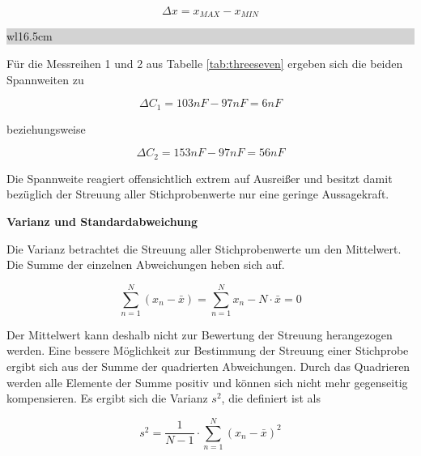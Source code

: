 \begin{equation}\label{eq:threetwentynine}
\Delta x=x_{MAX} -x_{MIN}
\end{equation}

\noindent
\colorbox{lightgray}{%
%
\renewcommand\arraystretch{0.6}%
\begin{tabular}{ wl{16.5cm} }
{\selectfont
{}}
\end{tabular}%
}\bigskip

\noindent F\"{u}r die Messreihen 1 und 2 aus Tabelle \ref{tab:threeseven} ergeben sich die beiden Spannweiten zu 

\begin{equation}\label{eq:threethirty}
\Delta C_{1} = 103 nF-97 nF=6 nF
\end{equation}

\noindent beziehungsweise 

\begin{equation}\label{eq:threethirtyone}
\Delta C_{2} = 153 nF - 97 nF = 56 nF
\end{equation}

\noindent Die Spannweite reagiert offensichtlich extrem auf Ausrei{\ss}er und besitzt damit bez\"{u}glich der Streuung aller Stichprobenwerte nur eine geringe Aussagekraft.\bigskip

{\selectfont
\noindent\textbf{Varianz und Standardabweichung}}

\noindent Die Varianz betrachtet die Streuung aller Stichprobenwerte um den Mittelwert. Die Summe der einzelnen Abweichungen heben sich auf.

\begin{equation}\label{eq:threethirtytwo}
\sum _{n=1}^{N}(x_{n} -\bar{x})= \sum _{n=1}^{N}x_{n} -N\cdot \bar{x}= 0
\end{equation}

\noindent Der Mittelwert kann deshalb nicht zur Bewertung der Streuung herangezogen werden. Eine bessere M\"{o}glichkeit zur Bestimmung der Streuung einer Stichprobe ergibt sich aus der Summe der quadrierten Abweichungen. Durch das Quadrieren werden alle Elemente der Summe positiv und k\"{o}nnen sich nicht mehr gegenseitig kompensieren. Es ergibt sich die Varianz $s^{2}$, die definiert ist als

\begin{equation}\label{eq:threethirtythree}
s^{2} =\dfrac{1}{N-1} \cdot \sum _{n=1}^{N}\left(x_{n} -\bar{x}\right)^{2}
\end{equation}


